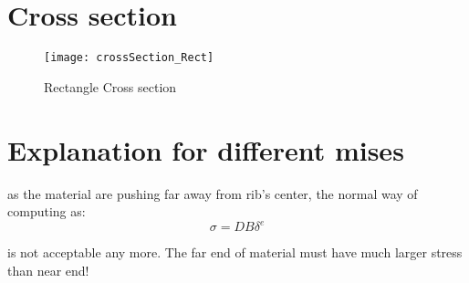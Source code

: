 \section{Cross section}
\begin{figure}[h]
	\centering
	\texttt{[image: crossSection\_Rect]}
	\caption{ Rectangle Cross section}
	\label{fig:crosssectionrect}
\end{figure}

\section{Explanation for different mises}
as the material are pushing far away from rib's center, the normal way of computing as:
\begin{equation}
\sigma = D B \delta^e
\end{equation}

is not acceptable any more. The far end of material must have much larger stress than near end!